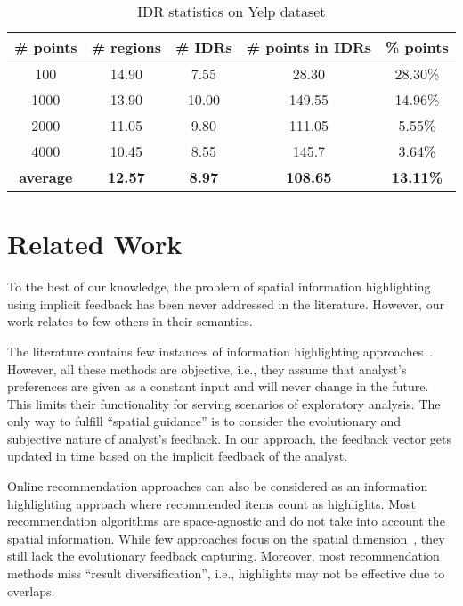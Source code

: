 \documentclass[sigconf,edbt]{acmart-edbt2019}
\begin{document}
\begin{table}[h]
\centering
\caption{IDR statistics on \textsf{Yelp} dataset}
\label{tbl:yelp}
\begin{tabular}{|c|c|c|c|c|}
\cline{1-5}
\textbf{\# points}  & \textbf{\# regions} 	& \textbf{\# IDRs} 	& \textbf{\# points in IDRs}	& \textbf{\%  points}	\\ \hline
\multicolumn{1}{|c|}{100} 				& 14.90            	& 7.55	          	& 28.30             & 28.30\%            
 \\ \hline
\multicolumn{1}{|c|}{1000} 				& 13.90         	& 10.00	          	& 149.55             & 14.96\%              \\ \hline
\multicolumn{1}{|c|}{2000} 				& 11.05         	& 9.80         	& 111.05             & 5.55\%              \\ \hline
\multicolumn{1}{|c|}{4000} 				& 10.45          	& 8.55	          	& 145.7              & 3.64\%              \\ \hline
\multicolumn{1}{|c|}{\textbf{average}} 				& \textbf{12.57}           	& \textbf{8.97}	          	& \textbf{108.65}              & \textbf{13.11\%}              \\ \hline
\end{tabular}
\end{table}

\section{Related Work}
\label{sec:rel}
To the best of our knowledge, the problem of spatial information highlighting using implicit feedback has been never addressed in the literature. However, our work relates to few others in their semantics.

\vspace{3pt}
 The literature contains few instances of information highlighting approaches~\cite{Liang2010,Robinson2011,wongsuphasawat2016voyager,willett2007scented}. However, all these methods are objective, i.e., they 	assume that analyst's preferences are given as a constant input and will never change in the future. This limits their functionality for serving scenarios of exploratory analysis. The only way to fulfill ``spatial guidance'' is to consider the evolutionary and subjective nature of analyst's feedback. In our approach, the feedback vector gets updated in time based on the implicit feedback of the analyst.

\vspace{2pt}
Online recommendation approaches can also be considered as an information highlighting approach where recommended items count as highlights. Most recommendation algorithms are space-agnostic and do not take into account the spatial information. While few approaches focus on the spatial dimension~\cite{Bao2015,Levandoski:2012,DrosouP12}, they still lack the evolutionary feedback capturing. Moreover, most recommendation methods miss ``result diversification'', i.e., highlights may not be effective due to overlaps.
\end{document}
